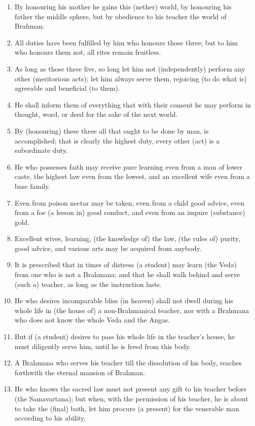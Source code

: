 \begin{enumerate}
\item By honouring his mother he gains this (nether) world, by honouring his father the middle sphere, but by obedience to his teacher the world of Brahman.
\item All duties have been fulfilled by him who honours those three; but to him who honours them not, all rites remain fruitless.
\item As long as those three live, so long let him not (independently) perform any other (meritorious acts); let him always serve them, rejoicing (to do what is) agreeable and beneficial (to them).
\item He shall inform them of everything that with their consent he may perform in thought, word, or deed for the sake of the next world.
\item By (honouring) these three all that ought to be done by man, is accomplished; that is clearly the highest duty, every other (act) is a subordinate duty.
\item He who possesses faith may receive pure learning even from a man of lower caste, the highest law even from the lowest, and an excellent wife even from a base family.
\item Even from poison nectar may be taken, even from a child good advice, even from a foe (a lesson in) good conduct, and even from an impure (substance) gold.
\item Excellent wives, learning, (the knowledge of) the law, (the rules of) purity, good advice, and various arts may be acquired from anybody.
\item It is prescribed that in times of distress (a student) may learn (the Veda) from one who is not a Brahmana; and that he shall walk behind and serve (such a) teacher, as long as the instruction lasts.
\item He who desires incomparable bliss (in heaven) shall not dwell during his whole life in (the house of) a non-Brahmanical teacher, nor with a Brahmana who does not know the whole Veda and the Angas.
\item But if (a student) desires to pass his whole life in the teacher's house, he must diligently serve him, until he is freed from this body.
\item A Brahmana who serves his teacher till the dissolution of his body, reaches forthwith the eternal mansion of Brahman.
\item He who knows the sacred law must not present any gift to his teacher before (the Samavartana); but when, with the permission of his teacher, he is about to take the (final) bath, let him procure (a present) for the venerable man according to his ability,

\end{enumerate}
